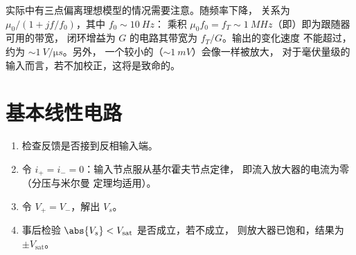 \begin{remark}[实际放大器]\label{rem:b1:operational-amplifier:real}
实际中有三点偏离理想模型的情况需要注意。随频率下降，
关系为 $\mu_0/(1 + jf/f_0)$，其中 $f_0 \sim \qty{10}{Hz}$：
乘积 $\mu_0 f_0 = f_T \sim \qty{1}{MHz}$（即\emph{}）即为跟随器可用的带宽，
闭环增益为 $G$ 的电路其带宽为 $f_T/G$。输出的变化速度
不能超过\emph{}，约为 $\sim\qty{1}{V/\micro s}$。另外，
一个较小的\emph{}（$\sim\qty{1}{mV}$）会像一样被放大，
对于毫伏量级的输入而言，若不加校正，这将是致命的。
\end{remark}

\section{基本线性电路}

\begin{method}[线性区中理想运算放大器电路的分析]\label{met:b1:operational-amplifier:method}
\begin{enumerate}
  \item 检查反馈是否接到反相输入端。
  \item 令 $i_+ = i_- = 0$：输入节点服从基尔霍夫节点定律，
        即流入放大器的电流为零（分压与米尔曼
        定理均适用）。
  \item 令 $V_+ = V_-$，解出 $V_s$。
  \item 事后检验 $\abs{V_s} < V_{\mathrm{sat}}$ 是否成立，若不成立，
        则放大器已饱和，结果为 $\pm V_{\mathrm{sat}}$。
\end{enumerate}
\end{method}

